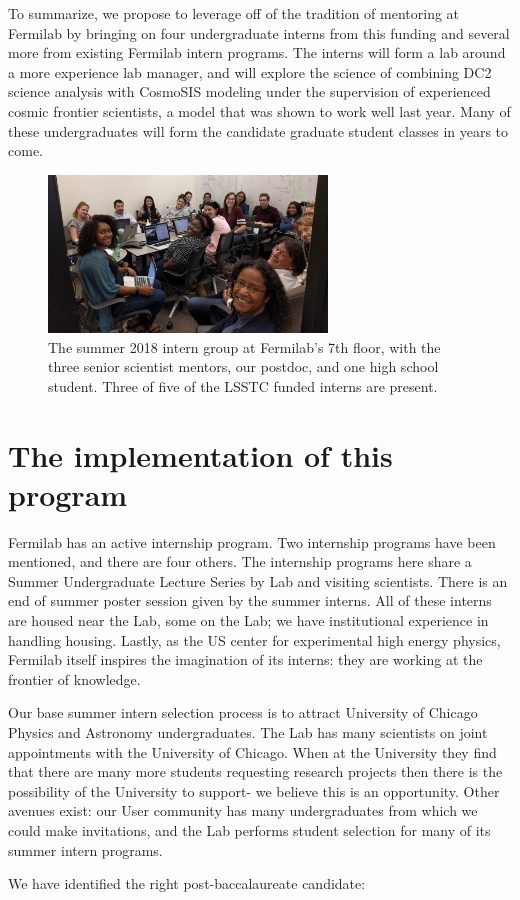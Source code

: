 To summarize, we  propose to leverage off of the tradition 
of mentoring at Fermilab by
bringing on four undergraduate interns from this funding
and several more from existing Fermilab intern programs.
The interns will form a lab around a more experience
lab manager, and will explore the science
of combining DC2 science analysis with CosmoSIS modeling
under the supervision of experienced cosmic
frontier scientists, a model that was shown to work
well last year. Many of these  undergraduates will
form the candidate graduate student classes in years to come.

\begin{figure}
  \centering
    \includegraphics[width=0.66\textwidth]{interns.png}
  \caption*{The summer 2018 intern group at Fermilab's 7th floor, with the 
three senior scientist mentors, our postdoc, and one high school student. 
Three of five of the LSSTC funded interns are present.}
\end{figure}

\newpage
\section{The implementation of this program}

Fermilab has an active internship program. Two internship programs
have been mentioned, and there are four others. The internship
programs here share a Summer Undergraduate Lecture Series by
Lab and visiting scientists. There is an end of summer poster
session given by the summer interns. All of these interns
are housed near the Lab, some on the Lab; we have institutional
experience in handling housing. Lastly, as the US center for
experimental high energy physics, Fermilab itself inspires
the imagination of its interns: they are working at the frontier
of knowledge.

Our base summer intern selection process is to attract
University of Chicago Physics and Astronomy undergraduates.
The Lab has many scientists on joint appointments with
the University of Chicago. When at the University they find
that there are  many more students
requesting research projects then there is the possibility of
the University to support- we believe this is an opportunity.
Other avenues exist: our User community has many undergraduates
from which we could make invitations, 
and the Lab performs student selection for many of its summer
intern programs.

We have identified the right post-baccalaureate candidate:



